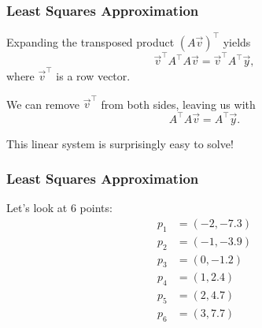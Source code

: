 \begin{frame}
	\frametitle{Least Squares Approximation}
	Expanding the transposed product $\left( A\vec{v} \right)^{\top}$ yields
	\begin{equation*}
		\vec{v}^{\top}A^{\top} A\vec{v} = \vec{v}^{\top}A^{\top} \vec{y},
	\end{equation*}
	where $\vec{v}^{\top}$ is a row vector.

	We can remove $\vec{v}^{\top}$ from both sides, leaving us with
	\begin{equation*}
		A^{\top} A\vec{v} = A^{\top} \vec{y}.
	\end{equation*}

	This linear system is surprisingly easy to solve!
\end{frame}

\begin{frame}
	\frametitle{Least Squares Approximation}
	\begin{presentation_example}
		Let's look at 6 points:
		\begin{align*}
			p_{1} &= \left( -2, -7.3 \right)\\
			p_{2} &= \left( -1, -3.9 \right)\\
			p_{3} &= \left( 0, -1.2 \right)\\
			p_{4} &= \left( 1, 2.4 \right)\\
			p_{5} &= \left( 2, 4.7 \right)\\
			p_{6} &= \left( 3, 7.7 \right)\\
		\end{align*}
	\end{presentation_example}
\end{frame}

